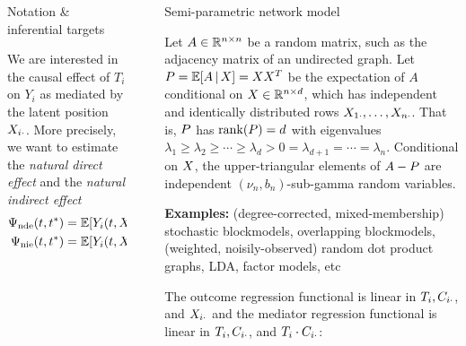\documentclass[final]{beamer}
\newlength{\sepwidth}
\newlength{\colwidth}
\newcommand{\separatorcolumn}{\begin{column}{\sepwidth}\end{column}}
\begin{document}
\begin{frame}[t]
\begin{columns}[t]
\begin{column}{\colwidth}
\begin{block}{Notation \& inferential targets}
\begin{minipage}{.5\textwidth}
        \end{minipage}

        We are interested in the causal effect of $T_i$ on $Y_i$ as mediated by the latent position $X_{i \cdot}$. More precisely, we want to estimate the \emph{natural direct effect} and the \emph{natural indirect effect}
        \begin{align*}
          \ndef & = \E{Y_i(t, \X_{i \cdot}(t^*)) - Y_i(t^*, \X_{i \cdot}(t^*))} \\
          \nief & = \E{Y_i(t, \X_{i \cdot}(t)) - Y_i(t, \X_{i \cdot}(t^*))}
        \end{align*}
      \end{block}

    \end{column}

    \separatorcolumn

    \begin{column}{\colwidth}

      \begin{block}{Semi-parametric network model}

        Let $A \in \mathbb{R}^{n \times n}$ be a random matrix, such as the adjacency matrix of an undirected graph. Let $\Apop = \E[\X]{A} = \X \X^T$ be the expectation of $A$ conditional on $X \in \mathbb{R}^{n \times d}$, which has independent and identically distributed rows $X_{1 \cdot}, \dots, X_{n \cdot}$. That is, $P$ has $\rank \paren*{\Apop} = d$ with eigenvalues $\lambda_1 \ge \lambda_2 \ge \cdots \ge \lambda_d > 0 = \lambda_{d+1} = \cdots = \lambda_n$. Conditional on $X$, the upper-triangular elements of $A - P$ are independent $(\nu_n, b_n)$-sub-gamma random variables.

        \textbf{Examples:} (degree-corrected, mixed-membership) stochastic blockmodels, overlapping blockmodels, (weighted, noisily-observed) random dot product graphs, LDA, factor models, etc

        The outcome regression functional is linear in $T_i, C_{i \cdot}$, and $X_{i \cdot}$ and the mediator regression functional is linear in $T_i, C_{i \cdot}$, and $T_i \cdot C_{i \cdot}$:


\end{block}
\end{column}
\end{columns}
\end{frame}
\end{document}
